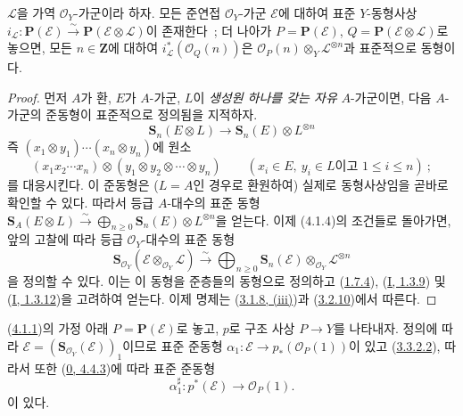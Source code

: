 
\begin{proposition}[4.1.4]
\label{II.4.1.4-ko}
$\mathcal{L}$을 가역 $\mathcal{O}_Y$-가군이라 하자. 모든 준연접
$\mathcal{O}_Y$-가군 $\mathcal{E}$에 대하여 표준 $Y$-동형사상
$i_{\mathcal{L}}:\mathbf{P}(\mathcal{E})\xrightarrow{\sim}
\mathbf{P}(\mathcal{E}\otimes\mathcal{L})$이 존재한다~; 더 나아가
$P=\mathbf{P}(\mathcal{E})$, $Q=\mathbf{P}(\mathcal{E}\otimes\mathcal{L})$로
놓으면, 모든 $n\in\mathbf{Z}$에 대하여
$i_{\mathcal{L}}^*(\mathcal{O}_Q(n))$은
$\mathcal{O}_P(n)\otimes_Y\mathcal{L}^{\otimes n}$과 표준적으로 동형이다.
\end{proposition}

\begin{proof}
먼저 $A$가 환, $E$가 $A$-가군, $L$이 \emph{생성원 하나를 갖는 자유}
$A$-가군이면, 다음 $A$-가군의 준동형이 표준적으로 정의됨을 지적하자.
\[
  \mathbf{S}_n(E\otimes L)\longrightarrow
  \mathbf{S}_n(E)\otimes L^{\otimes n}
\]
즉 $(x_1\otimes y_1)\cdots(x_n\otimes y_n)$에 원소
\[
  (x_1x_2\cdots x_n)\otimes(y_1\otimes y_2\otimes\cdots\otimes y_n)
  \qquad(x_i\in E,\ y_i\in L\text{이고 }1\leq i\leq n)~;
\]
를 대응시킨다. 이 준동형은 ($L=A$인 경우로 환원하여) 실제로
동형사상임을 곧바로 확인할 수 있다. 따라서 등급 $A$-대수의 표준 동형
$\mathbf{S}_A(E\otimes L)\xrightarrow{\sim}
\bigoplus_{n\geq0}\mathbf{S}_n(E)\otimes L^{\otimes n}$을 얻는다. 이제
(4.1.4)의 조건들로 돌아가면, 앞의 고찰에 따라 등급
$\mathcal{O}_Y$-대수의 표준 동형
\[
\label{II.4.1.4.1-ko}
  \mathbf{S}_{\mathcal{O}_Y}(\mathcal{E}\otimes_{\mathcal{O}_Y}\mathcal{L})
  \xrightarrow{\sim}
  \bigoplus_{n\geq0}\mathbf{S}_n(\mathcal{E})
  \otimes_{\mathcal{O}_Y}\mathcal{L}^{\otimes n}
\tag{4.1.4.1}
\]
을 정의할 수 있다. 이는 이 동형을 준층들의 동형으로 정의하고
(\hyperref[II.1.7.4-ko]{1.7.4}),
(\hyperref[I.1.3.9-ko]{I, 1.3.9}) 및
(\hyperref[I.1.3.12-ko]{I, 1.3.12})을 고려하여 얻는다. 이제 명제는
(\hyperref[II.3.1.8-ko]{3.1.8, (iii)})과
(\hyperref[II.3.2.10-ko]{3.2.10})에서 따른다.
\end{proof}

\begin{env}[4.1.5]
\label{II.4.1.5-ko}
(\hyperref[II.4.1.1-ko]{4.1.1})의 가정 아래
$P=\mathbf{P}(\mathcal{E})$로 놓고, $p$로 구조 사상 $P\to Y$를 나타내자.
정의에 따라 $\mathcal{E}=(\mathbf{S}_{\mathcal{O}_Y}(\mathcal{E}))_1$이므로
표준 준동형 $\alpha_1:\mathcal{E}\to p_*(\mathcal{O}_P(1))$이 있고
(\hyperref[II.3.3.2.2-ko]{3.3.2.2}), 따라서 또한
(\hyperref[0.4.4.3-ko]{0, 4.4.3})에 따라 표준 준동형
\[
\label{II.4.1.5.1-ko}
  \alpha_1^\sharp:p^*(\mathcal{E})\longrightarrow\mathcal{O}_P(1).
\tag{4.1.5.1}
\]
이 있다.
\end{env}


